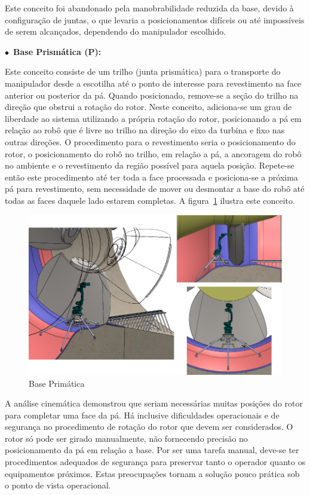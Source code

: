   Este conceito foi abandonado pela manobrabilidade reduzida da base, devido à
  configuração de juntas, o que levaria a posicionamentos difíceis ou até
  impossíveis de serem alcançados, dependendo do manipulador escolhido.
  
$\bullet$~\textbf{Base Prismática (P):}

  Este conceito consiste de um trilho (junta prismática) para o transporte do
  manipulador desde a escotilha até o ponto de interesse para revestimento na
  face anterior ou posterior da pá. Quando posicionado, remove-se a seção
  do trilho na direção que obstrui a rotação do rotor. Neste conceito,
  adiciona-se um grau de liberdade ao sistema utilizando a própria rotação do
  rotor, posicionando a pá em relação ao robô que é livre no trilho na direção
  do eixo da turbina e fixo nas outras direções. O procedimento para o
  revestimento seria o posicionamento do rotor, o posicionamento do robô no
  trilho, em relação a pá, a ancoragem do robô no ambiente e o revestimento da 
  região possível para aquela posição.
  Repete-se então este procedimento até ter toda a face processada e
  posiciona-se a próxima pá para revestimento, sem necessidade de mover ou
  desmontar a base do robô até todas as faces daquele lado estarem completas.  A
  figura~\ref{fig::base_p} ilustra este conceito.
  
  \begin{figure}[h!]
   \centering
   \includegraphics[width=0.8\columnwidth]{figs/bases/base_p}
   \caption{Base Primática}
   \label{fig::base_p}
\end{figure}

  A análise cinemática demonstrou que seriam necessárias muitas posições do
  rotor para completar uma face da pá. Há inclusive dificuldades operacionais e
  de segurança no procedimento de rotação do rotor que devem ser considerados. O
  rotor só pode ser girado manualmente, não fornecendo precisão no
  posicionamento da pá em relação a base. Por ser uma tarefa manual, deve-se ter
  procedimentos adequados de segurança para preservar tanto o operador quanto os
  equipamentos próximos. Estas preocupações tornam a solução pouco prática sob o
  ponto de vista operacional.

